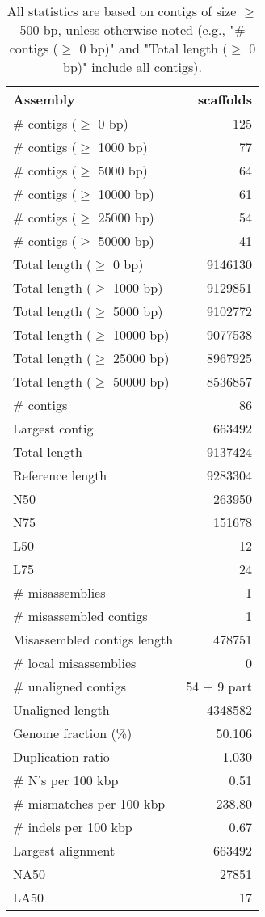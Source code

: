 \documentclass[12pt,a4paper]{article}
\begin{document}
\begin{table}[ht]
\begin{center}
\caption{All statistics are based on contigs of size $\geq$ 500 bp, unless otherwise noted (e.g., "\# contigs ($\geq$ 0 bp)" and "Total length ($\geq$ 0 bp)" include all contigs).}
\begin{tabular}{|l*{1}{|r}|}
\hline
Assembly & scaffolds \\ \hline
\# contigs ($\geq$ 0 bp) & 125 \\ \hline
\# contigs ($\geq$ 1000 bp) & 77 \\ \hline
\# contigs ($\geq$ 5000 bp) & 64 \\ \hline
\# contigs ($\geq$ 10000 bp) & 61 \\ \hline
\# contigs ($\geq$ 25000 bp) & 54 \\ \hline
\# contigs ($\geq$ 50000 bp) & 41 \\ \hline
Total length ($\geq$ 0 bp) & 9146130 \\ \hline
Total length ($\geq$ 1000 bp) & 9129851 \\ \hline
Total length ($\geq$ 5000 bp) & 9102772 \\ \hline
Total length ($\geq$ 10000 bp) & 9077538 \\ \hline
Total length ($\geq$ 25000 bp) & 8967925 \\ \hline
Total length ($\geq$ 50000 bp) & 8536857 \\ \hline
\# contigs & 86 \\ \hline
Largest contig & 663492 \\ \hline
Total length & 9137424 \\ \hline
Reference length & 9283304 \\ \hline
N50 & 263950 \\ \hline
N75 & 151678 \\ \hline
L50 & 12 \\ \hline
L75 & 24 \\ \hline
\# misassemblies & 1 \\ \hline
\# misassembled contigs & 1 \\ \hline
Misassembled contigs length & 478751 \\ \hline
\# local misassemblies & 0 \\ \hline
\# unaligned contigs & 54 + 9 part \\ \hline
Unaligned length & 4348582 \\ \hline
Genome fraction (\%) & 50.106 \\ \hline
Duplication ratio & 1.030 \\ \hline
\# N's per 100 kbp & 0.51 \\ \hline
\# mismatches per 100 kbp & 238.80 \\ \hline
\# indels per 100 kbp & 0.67 \\ \hline
Largest alignment & 663492 \\ \hline
NA50 & 27851 \\ \hline
LA50 & 17 \\ \hline
\end{tabular}
\end{center}
\end{table}
\end{document}
